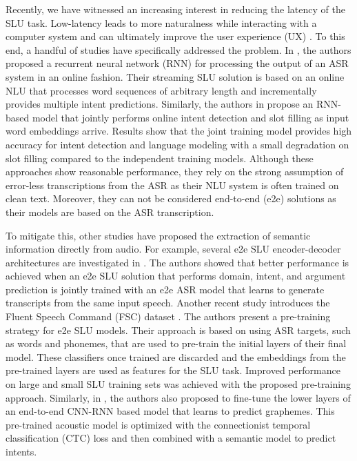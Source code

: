 \documentclass[a4paper]{article}
\begin{document}
Recently, we have witnessed an increasing interest in reducing the latency of the SLU task. Low-latency leads to more naturalness while interacting with a computer system and can ultimately improve the user experience (UX) \cite{porcheron2018voice}. To this end, a handful of studies have specifically addressed the problem. In \cite{shivakumar2019incremental}, the authors proposed a recurrent neural network (RNN) for processing the output of an ASR system in an online fashion. Their streaming SLU solution is based on an online NLU that processes word sequences of arbitrary length and incrementally provides multiple intent predictions. Similarly, the authors in \cite{liu2016joint} propose an RNN-based model that jointly performs online intent detection and slot filling as input word embeddings arrive. Results show that the joint training model provides high accuracy for intent detection and language modeling with a small degradation on slot filling compared to the independent training models. Although these approaches show reasonable performance, they rely on the strong assumption of error-less transcriptions from the ASR as their NLU system is often trained on clean text. Moreover, they can not be considered end-to-end (e2e) solutions as their models are based on the ASR transcription. 



To mitigate this, other studies have proposed the extraction of semantic information directly from audio. For example, several e2e SLU encoder-decoder architectures are investigated in \cite{haghani2018audio}. The authors showed that better performance is achieved when an e2e SLU solution that performs domain, intent, and argument prediction is jointly trained with an e2e ASR model that learns to generate transcripts from the same input speech. Another recent study introduces the Fluent Speech Command (FSC) dataset \cite{lugosch2019speech}. The authors present a pre-training strategy for e2e SLU models. Their approach is based on using ASR targets, such as words and phonemes, that are used to pre-train the initial layers of their final model. These classifiers once trained are discarded and the embeddings from the pre-trained layers are used as features for the SLU task. Improved performance on large and small SLU training sets was achieved with the proposed pre-training approach. Similarly, in \cite{chen2018spoken}, the authors also proposed to fine-tune the lower layers of an end-to-end CNN-RNN based model that learns to predict graphemes. This pre-trained acoustic model is optimized with the connectionist temporal classification (CTC) loss and then combined with a semantic model to predict intents. 
\end{document}
